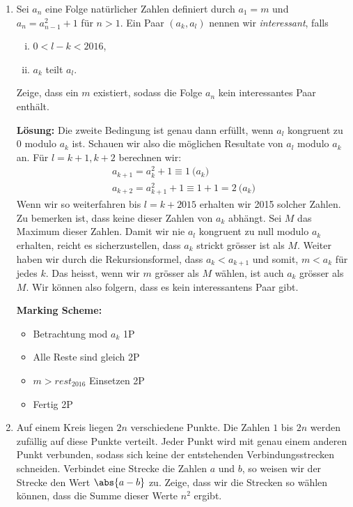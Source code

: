 \documentclass[language=german,style=solution]{smo}
\begin{document}
\begin{enumerate}[label=\textbf{\arabic*.}]
\newpage

\item Sei $a_n$ eine Folge natürlicher Zahlen definiert durch $a_1 = m$ und $a_n = a^2_{n-1}+1$ für $n>1$. Ein Paar $(a_k, a_l)$ nennen wir \emph{interessant}, falls
\begin{enumerate}[(i)]
\item $0<l-k<2016$,
\item $a_k$ teilt $a_l$.
\end{enumerate}
Zeige, dass ein $m$ existiert, sodass die Folge $a_n$ kein interessantes Paar enthält.

\textbf{Lösung:} Die zweite Bedingung ist genau dann erfüllt, wenn $a_l$ kongruent zu 0 modulo $a_k$ ist. Schauen wir also die möglichen Resultate von $a_l$ modulo $a_k$ an.
Für $l=k+1,k+2$ berechnen wir:
\begin{align*}
a_{k+1} = a_k ^2 + 1 \equiv 1 \pod{a_k}\\
 a_{k+2} = a_{k+1} ^2 + 1 \equiv 1 + 1 = 2 \pod{a_k}
 \end{align*}
Wenn wir so weiterfahren bis $l=k+2015$ erhalten wir 2015 solcher Zahlen. Zu bemerken ist, dass keine dieser Zahlen von $a_k$ abhängt. Sei $M$ das Maximum dieser Zahlen. Damit wir nie $a_l$ kongruent zu null modulo $a_k$ erhalten, reicht es sicherzustellen, dass $a_k$ strickt grösser ist als $M$.
Weiter haben wir durch die Rekursionsformel, dass $a_k < a_{k+1}$ und somit, $m < a_k$ für jedes $k$. Das heisst, wenn wir $m$ grösser als $M$ wählen, ist auch $a_k$ grösser als $M$. Wir können also folgern, dass es kein interessantens Paar gibt.

\textbf{Marking Scheme:}
\begin{itemize}
\item Betrachtung mod $a_k$ 1P
\item Alle Reste sind gleich 2P
\item $m > rest_{2016}$ Einsetzen 2P
\item Fertig	 2P
\end{itemize}

\newpage

\item Auf einem Kreis liegen $2n$ verschiedene Punkte. Die Zahlen $1$ bis $2n$ werden zufällig auf diese Punkte verteilt. Jeder Punkt wird mit genau einem anderen Punkt verbunden, sodass sich keine der entstehenden Verbindungsstrecken schneiden. Verbindet eine Strecke die Zahlen $a$ und $b$, so weisen wir der Strecke den Wert $\abs{a-b}$ zu. Zeige, dass wir die Strecken so wählen können, dass die Summe dieser Werte $n^2$ ergibt.


\end{enumerate}
\end{document}
